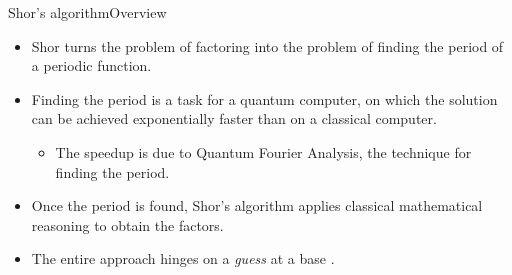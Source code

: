 \begin{frame}{Shor's algorithm}{Overview}

\begin{itemize}
    \item Shor turns the problem of factoring into the problem of \alert{finding the period} of a periodic function.
    \item Finding the period is a task for a quantum computer, on which the solution can be achieved exponentially faster than on a classical computer.
    \begin{itemize}
    \item The speedup is due to Quantum Fourier Analysis, the technique for finding the period.
    \end{itemize}
    \item Once the period is found, Shor's algorithm applies classical mathematical reasoning to obtain the factors.
    \item The entire approach hinges on a \emph{guess} at a base .
\end{itemize}
    
\end{frame}

